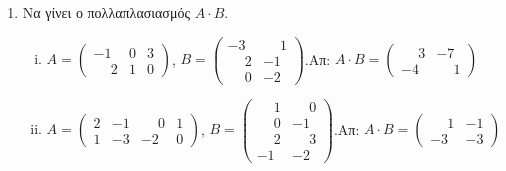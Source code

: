



\pagestyle{askhseis}





\begin{center}
  \minibox[c]{\large \bfseries \textcolor{Col1}{Ασκήσεις στον Πολ/σμό Πινάκων} \\
  \large \bfseries \textcolor{Col1}{και στις Ορίζουσες}}
\end{center}

\vspace{\baselineskip}


\begin{enumerate}

\item Να γίνει ο πολλαπλασιασμός $A \cdot B$.

\begin{enumerate}[i)]
    \renewcommand{\itemsep}{10pt}
\item $A=\begin{pmatrix}
-1 & 0 & 3 \\
\phantom{-}2 & 1 & 0 
\end{pmatrix}$,
\quad
$B=\begin{pmatrix}
-3 & \phantom{-}1 \\
\phantom{-}2 & -1 \\ 
\phantom{-}0 & -2
\end{pmatrix}$.\hfill Απ: $A\cdot B = \begin{pmatrix}
\phantom{-}3 & -7 \\
-4 & \phantom{-}1
\end{pmatrix}$

\item $A=\begin{pmatrix}
2 & -1 & \phantom{-}0 & 1 \\
1 & -3 & -2 & 0
\end{pmatrix}$,
\quad
$B=\begin{pmatrix}
\phantom{-}1 & \phantom{-}0 \\
\phantom{-}0 & -1 \\
\phantom{-}2 & \phantom{-}3 \\
-1 & -2 
\end{pmatrix}$.\hfill Απ: $A\cdot B=\begin{pmatrix}
\phantom{-}1 & -1 \\
-3 & -3 
\end{pmatrix}$


\end{enumerate}
\end{enumerate}
